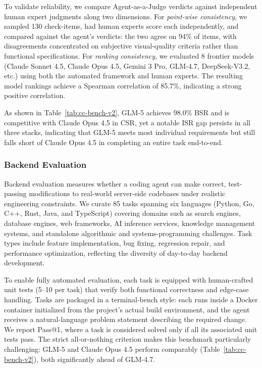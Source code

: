 \documentclass{article}
\theoremstyle{definition}
\begin{document}
To validate reliability, we compare Agent-as-a-Judge verdicts against independent human expert judgments along two dimensions. For \emph{point-wise consistency}, we sampled 130 check-items, had human experts score each independently, and compared against the agent's verdicts: the two agree on 94\% of items, with disagreements concentrated on subjective visual-quality criteria rather than functional specifications. For \emph{ranking consistency}, we evaluated 8 frontier models (Claude Sonnet 4.5, Claude Opus 4.5, Gemini 3 Pro, GLM-4.7, DeepSeek-V3.2, etc.) using both the automated framework and human experts. The resulting model rankings achieve a Spearman correlation of 85.7\%, indicating a strong positive correlation.

As shown in Table~\ref{tab:cc-bench-v2}, GLM-5 achieves 98.0\% BSR and is competitive with Claude Opus 4.5 in CSR, yet a notable ISR gap persists in all three stacks, indicating that GLM-5 meets most individual requirements but still falls short of Claude Opus 4.5 in completing an entire task end-to-end.

\subsubsection{Backend Evaluation}

Backend evaluation measures whether a coding agent can make correct, test-passing modifications to real-world server-side codebases under realistic engineering constraints. We curate 85 tasks spanning six languages (Python, Go, C++, Rust, Java, and TypeScript) covering domains such as search engines, database engines, web frameworks, AI inference services, knowledge management systems, and standalone algorithmic and systems-programming challenges. Task types include feature implementation, bug fixing, regression repair, and performance optimization, reflecting the diversity of day-to-day backend development.

To enable fully automated evaluation, each task is equipped with human-crafted unit tests (5--10 per task) that verify both functional correctness and edge-case handling. Tasks are packaged in a terminal-bench style: each runs inside a Docker container initialized from the project's actual build environment, and the agent receives a natural-language problem statement describing the required change. We report Pass@1, where a task is considered solved only if all its associated unit tests pass. The strict all-or-nothing criterion makes this benchmark particularly challenging: GLM-5 and Claude Opus 4.5 perform comparably (Table~\ref{tab:cc-bench-v2}), both significantly ahead of GLM-4.7.
\end{document}
